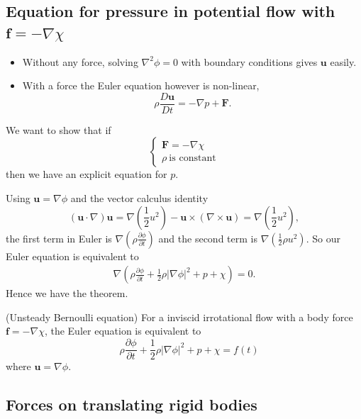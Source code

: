 \documentclass{article}
\begin{document}
\subsection{Equation for pressure in potential flow with $ \mathbf f = -\nabla\chi $}
\begin{itemize}
	\item Without any force, solving $ \nabla^2 \phi =0 $ with boundary conditions gives $ \mathbf u $ easily.
	\item With a force the Euler equation however is non-linear,
		\[
			\rho \frac{D \mathbf u}{Dt} = - \nabla p +\mathbf F.
		\]
\end{itemize}
We want to show that if 
\[
  \begin{cases}
    \mathbf F = -\nabla\chi \\
    \rho \ \text{is constant}
  \end{cases}
\]
then we have an explicit equation for $ p $.
\par
Using $ \mathbf u = \nabla\phi $ and the vector calculus identity
\[
	(\mathbf u \cdot\nabla )\mathbf u = \nabla\left(\frac 12 u^2\right) - \mathbf u \times(\nabla\times\mathbf u) = \nabla\left(\frac 12 u^2\right),
\]
the first term in Euler is $ \nabla\left(\rho \frac{\partial \phi}{\partial t}\right) $ and the second term is $ \nabla\left(\frac 12 \rho u^2\right) $. So our Euler equation is equivalent to
\begin{align*}
	\nabla\left(\rho \frac{\partial \phi}{\partial t} + \frac 12 \rho |\nabla\phi|^2 + p + \chi\right) = 0.
\end{align*}
Hence we have the theorem.
\begin{theorem}
	(Unsteady Bernoulli equation) For a inviscid irrotational flow with a body force $ \mathbf f=- \nabla\chi $, the Euler equation is equivalent to
	\[
	\quad \rho\frac{\partial \phi}{\partial t} + \frac 12 \rho|\nabla\phi|^2 + p + \chi = f(t)
\]
where $ \mathbf u = \nabla \phi $.
\end{theorem}
\subsection{Forces on translating rigid bodies}
\end{document}
